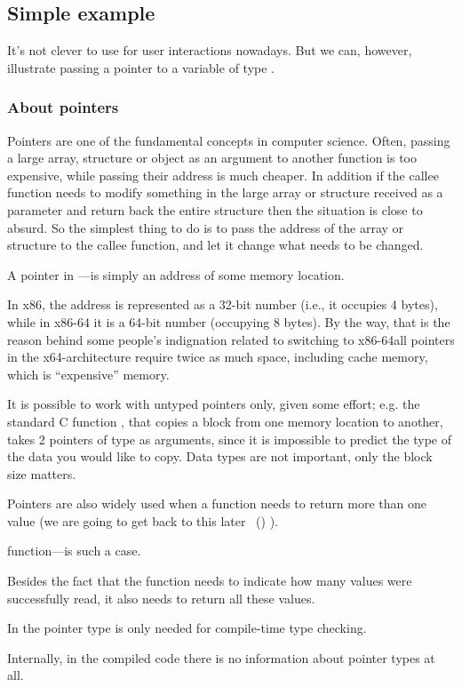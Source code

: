 \subsection{Simple example}



It's not clever to use \scanf for user interactions nowadays. 
But we can, however, illustrate passing a pointer to a variable of type \Tint.

\subsubsection{About pointers}
\myindex{\CLanguageElements!\Pointers}

Pointers are one of the fundamental concepts in computer science.
Often, passing a large array, structure or object as an argument to another function is too expensive, while passing their address is much cheaper.
In addition if the \gls{callee} function needs to modify something in the large array or structure received as a parameter and return back the entire structure then the situation is close to absurd.
So the simplest thing to do is to pass the address of the array or structure to the \gls{callee} function, and let it change what needs to be changed.

A pointer in \CCpp---is simply an address of some memory location.

In x86, the address is represented as a 32-bit number (i.e., it occupies 4 bytes), while in x86-64 it is a 64-bit number (occupying 8 bytes).
By the way, that is the reason behind some people's indignation related to switching to x86-64\EMDASH{}all pointers in the x64-architecture require twice as much space, including cache memory, which is ``expensive'' memory.

It is possible to work with untyped pointers only, given some effort; e.g. the standard C function , that copies a block from one memory location to another,
takes 2 pointers of type  as arguments, since it is impossible to predict the type of the data you would like to copy. Data types are not important, only the block size matters.

Pointers are also widely used when a function needs to return more than one value
(we are going to get back to this later
~()
).

 function---is such a case.

Besides the fact that the function needs to indicate how many values were successfully read, it also needs to return all these values.

In \CCpp the pointer type is only needed for compile-time type checking.

Internally, in the compiled code there is no information about pointer types at all.





